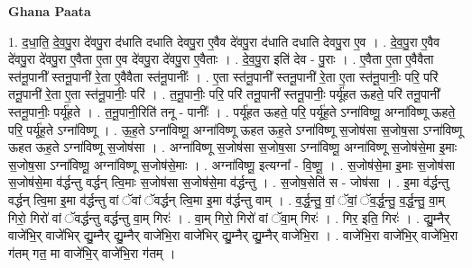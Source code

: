 \documentclass[17pt]{extarticle}
\begin{document}
\textbf{Ghana Paata } \newline

1. द॒धा॒ति॒ दे॒व॒पु॒रा दे॑वपु॒रा द॑धाति दधाति देवपु॒रा ए॒वैव दे॑वपु॒रा द॑धाति दधाति देवपु॒रा ए॒व । . दे॒व॒पु॒रा ए॒वैव दे॑वपु॒रा दे॑वपु॒रा ए॒वैता ए॒ता ए॒व दे॑वपु॒रा दे॑वपु॒रा ए॒वैताः । . दे॒व॒पु॒रा इति॑ देव - पु॒राः । . ए॒वैता ए॒ता ए॒वैवैता स्त॑नू॒पानी᳚ स्तनू॒पानी॑ रे॒ता ए॒वैवैता स्त॑नू॒पानीः᳚ । . ए॒ता स्त॑नू॒पानी᳚ स्तनू॒पानी॑ रे॒ता ए॒ता स्त॑नू॒पानीः॒ परि॒ परि॑ तनू॒पानी॑ रे॒ता ए॒ता स्त॑नू॒पानीः॒ परि॑ । . त॒नू॒पानीः॒ परि॒ परि॑ तनू॒पानी᳚ स्तनू॒पानीः॒ पर्यू॑हत ऊहते॒ परि॑ तनू॒पानी᳚ स्तनू॒पानीः॒ पर्यू॑हते । . त॒नू॒पानी॒रिति॑ तनू - पानीः᳚ । . पर्यू॑हत ऊहते॒ परि॒ पर्यू॑ह॒ते ऽग्ना॑विष्णू॒ अग्ना॑विष्णू ऊहते॒ परि॒ पर्यू॑ह॒ते ऽग्ना॑विष्णू । . ऊ॒ह॒ते ऽग्ना॑विष्णू॒ अग्ना॑विष्णू ऊहत ऊह॒ते ऽग्ना॑विष्णू स॒जोष॑सा स॒जोष॒सा ऽग्ना॑विष्णू ऊहत ऊह॒ते ऽग्ना॑विष्णू स॒जोष॑सा । . अग्ना॑विष्णू स॒जोष॑सा स॒जोष॒सा ऽग्ना॑विष्णू॒ अग्ना॑विष्णू स॒जोष॑से॒मा इ॒माः स॒जोष॒सा ऽग्ना॑विष्णू॒ अग्ना॑विष्णू स॒जोष॑से॒माः । . अग्ना॑विष्णू॒ इत्यग्ना᳚ - वि॒ष्णू॒ । . स॒जोष॑से॒मा इ॒माः स॒जोष॑सा स॒जोष॑से॒मा व॑र्द्धन्तु वर्द्धन् त्वि॒माः स॒जोष॑सा स॒जोष॑से॒मा व॑र्द्धन्तु । . स॒जोष॒सेति॑ स - जोष॑सा । . इ॒मा व॑र्द्धन्तु वर्द्धन् त्वि॒मा इ॒मा व॑र्द्धन्तु वां ॅवां ॅवर्द्धन् त्वि॒मा इ॒मा व॑र्द्धन्तु वाम् । . व॒र्द्ध॒न्तु॒ वां॒ ॅवां॒ ॅव॒र्द्ध॒न्तु॒ व॒र्द्ध॒न्तु॒ वा॒म् गिरो॒ गिरो॑ वां ॅवर्द्धन्तु वर्द्धन्तु वा॒म् गिरः॑ । . वा॒म् गिरो॒ गिरो॑ वां ॅवा॒म् गिरः॑ । . गिर॒ इति॒ गिरः॑ । . द्यु॒म्नैर् वाजे॑भि॒र् वाजे॑भिर् द्यु॒म्नैर् द्यु॒म्नैर् वाजे॑भि॒रा वाजे॑भिर् द्यु॒म्नैर् द्यु॒म्नैर् वाजे॑भि॒रा । . वाजे॑भि॒रा वाजे॑भि॒र् वाजे॑भि॒रा ग॑तम् गत॒ मा वाजे॑भि॒र् वाजे॑भि॒रा ग॑तम् । \newline
\end{document}
